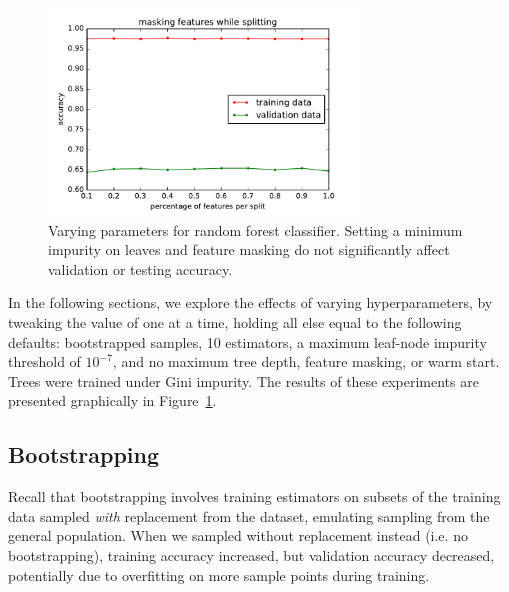 \documentclass{article}
\begin{document}
\begin{multicols}{2}
\begin{figure}[t]
   \includegraphics[width=3.25in]{img/rf-maskingFeatures.pdf}
   \caption{Varying parameters for random forest classifier.
     Setting a minimum impurity on leaves and feature masking
     do not significantly affect validation or testing accuracy.}
   \label{fig:rf-params}
\end{figure}


In the following sections,
we explore the effects of varying hyperparameters,
by tweaking the value of one at a time,
holding all else equal to the following defaults:
bootstrapped samples,
10 estimators,
a maximum leaf-node impurity threshold of $10^{-7}$,
and no maximum tree depth,
feature masking, or warm start.
Trees were trained under Gini impurity.
The results of these experiments
are presented graphically in Figure~\ref{fig:rf-params}.

\subsection{Bootstrapping}

Recall that bootstrapping involves
training estimators on subsets of the training data
sampled \emph{with} replacement from the dataset,
emulating sampling from the general population.
When we sampled without replacement instead
(i.e. no bootstrapping),
training accuracy increased,
but validation accuracy decreased,
potentially due to overfitting on more sample points during training.


\end{multicols}
\end{document}
